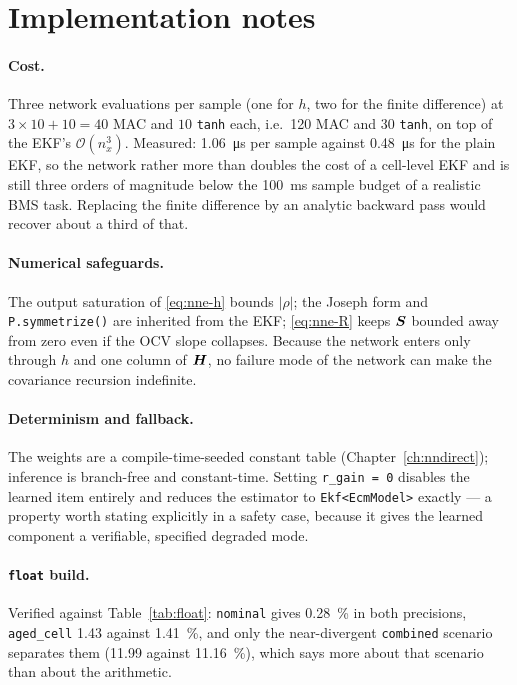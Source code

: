 \section{Implementation notes}
\paragraph{Cost.}  Three network evaluations per sample (one for $h$, two for the finite
difference) at $3\times 10 + 10 = \num{40}$ MAC and $10$ \texttt{tanh} each, i.e.\ \num{120} MAC
and $30$ \texttt{tanh}, on top of the EKF's $\mathcal{O}(n_x^3)$.  Measured:
\SI{1.06}{\micro\second} per sample against \SI{0.48}{\micro\second} for the plain EKF, so the
network rather more than doubles the cost of a cell-level EKF and is still three orders of
magnitude below the \SI{100}{\milli\second} sample budget of a realistic BMS task.  Replacing the finite difference by an analytic backward
pass would recover about a third of that.

\paragraph{Numerical safeguards.}  The output saturation of \cref{eq:nne-h} bounds $|\rho|$; the
Joseph form and \texttt{P.symmetrize()} are inherited from the EKF; \cref{eq:nne-R} keeps $\bm{S}$
bounded away from zero even if the OCV slope collapses.  Because the network enters only through
$h$ and one column of $\bm{H}$, no failure mode of the network can make the covariance recursion
indefinite.

\paragraph{Determinism and fallback.}  The weights are a compile-time-seeded constant table
(Chapter~\ref{ch:nndirect}); inference is branch-free and constant-time.  Setting
\texttt{r\_gain = 0} disables the learned item entirely and reduces the estimator to
\texttt{Ekf<EcmModel>} exactly --- a property worth stating explicitly in a safety case, because it
gives the learned component a verifiable, specified degraded mode.

\paragraph{\texttt{float} build.}  Verified against Table~\ref{tab:float}: \texttt{nominal} gives
\SI{0.28}{\percent} in both precisions, \texttt{aged\_cell} \SI{1.43}{} against \SI{1.41}{\percent},
and only the near-divergent \texttt{combined} scenario separates them (\SI{11.99}{} against
\SI{11.16}{\percent}), which says more about that scenario than about the arithmetic.

